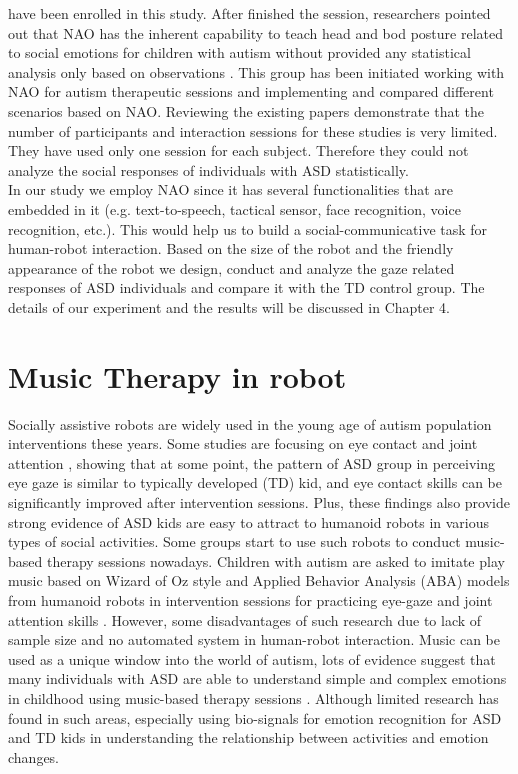 have been enrolled in this study. After finished the session, researchers pointed out that NAO 
has the inherent capability to teach head and bod posture related to social emotions for children 
with autism without provided any statistical analysis only based on observations \cite{shamsuddin2013humanoid}. This group 
has been initiated working with NAO for autism therapeutic sessions and implementing and compared 
different scenarios based on NAO. Reviewing the existing papers demonstrate that the number of 
participants and interaction sessions for these studies is very limited. They have used only one 
session for each subject. Therefore they could not analyze the social responses of individuals with 
ASD statistically.\\

In our study we employ NAO since it has several functionalities that are embedded in it (e.g. 
text-to-speech, tactical sensor, face recognition, voice recognition, etc.). This would help us to 
build a social-communicative task for human-robot interaction. Based on the size of the robot and 
the friendly appearance of the robot we design, conduct and analyze the gaze related responses of 
ASD individuals and compare it with the TD control group. The details of our experiment and the results 
will be discussed in Chapter 4.\\

\section{Music Therapy in robot}
Socially assistive robots are widely used in the young age of autism population interventions these years. Some studies are
focusing on eye contact and joint attention \cite{feng2013can, mihalache2020perceiving, mavadati2014comparing}, 
showing that at some point, the pattern of ASD group in perceiving eye gaze is similar to typically 
developed (TD) kid, and eye contact skills can be significantly improved after intervention sessions. Plus,
these findings also provide strong evidence of ASD kids are easy to attract to humanoid robots in
various types of social activities. Some groups start to use such robots to conduct music-based therapy
sessions nowadays. Children with autism are asked to imitate play music based on Wizard of Oz style
and Applied Behavior Analysis (ABA) models from humanoid robots in intervention sessions for practicing
eye-gaze and joint attention skills \cite{peng2014using, taheri2015impact, taheri2016social}. However, 
some disadvantages of such research due to lack of sample size and no automated system in human-robot 
interaction. Music can be used as a unique window into the world of autism, lots of evidence suggest that
many individuals with ASD are able to understand simple and complex emotions in childhood using music-based
therapy sessions \cite{molnar2012music}. Although limited research has found in such areas, especially using
bio-signals for emotion recognition for ASD and TD kids \cite{feng2018wavelet} in understanding the 
relationship between activities and emotion changes. \\

